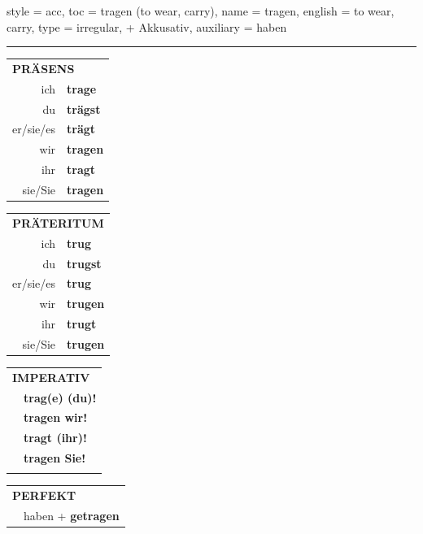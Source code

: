 \begin{verbentry}{
  style = {acc},
  toc = {tragen (to wear, carry)},
  name = {tragen},
  english = {to wear, carry},
  type = {irregular, + Akkusativ},
  auxiliary = {haben}
}
 
    
     \vspace{5pt}

    \hrule
    
    \vspace{5pt}

  \begin{tabular}{rl}
     \multicolumn{2}{l}{\textbf{PRÄSENS} }\\
    ich & \textbf{trage}\\
    du & \textbf{trägst}\\
    er/sie/es & \textbf{trägt}\\
    wir & \textbf{tragen}\\
    ihr & \textbf{tragt}\\
    sie/Sie & \textbf{tragen}\\
  \end{tabular}
  \hfill
     \begin{tabular}{rl}
    \multicolumn{2}{l}{\textbf{PRÄTERITUM} }\\
    ich & \textbf{trug}\\
    du & \textbf{trugst}\\
    er/sie/es & \textbf{trug}\\
    wir & \textbf{trugen}\\
    ihr & \textbf{trugt}\\
    sie/Sie & \textbf{trugen}\\
  \end{tabular}
  \hfill
  \begin{tabular}{rl}
     \multicolumn{2}{l}{\textbf{IMPERATIV} }\\
   & \textbf{trag(e) (du)!}\\
   & \textbf{tragen wir!}\\
   & \textbf{tragt (ihr)!}\\
   & \textbf{tragen Sie!}\\
   & \vspace{10pt}
  \end{tabular}

    \vspace{10pt}

 \begin{tabular}{rl}
     \multicolumn{2}{l}{\textbf{PERFEKT}}\\
   & haben + \textbf{getragen}\\
  \end{tabular}
\hfill
   \begin{tabular}{rl}
   

\end{tabular}
\end{verbentry}
